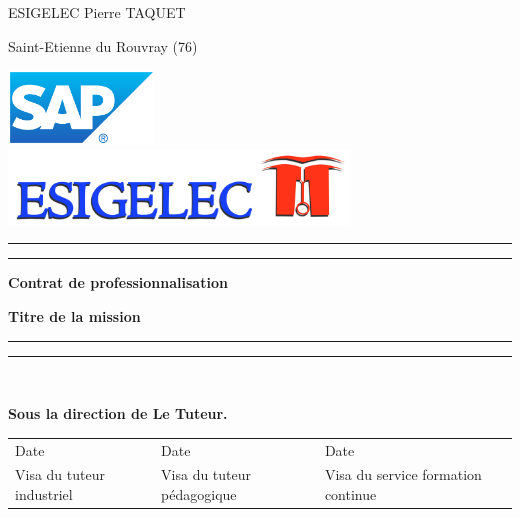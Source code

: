 
\begin{titlepage}
\parindent=0pt

ESIGELEC  Pierre TAQUET

Saint-Etienne du Rouvray (76)


\begin{center}
\includegraphics[height=75px]{images/SAP.png}\\
\includegraphics[height=75px]{images/ESIGELEC.jpg}
\end{center}

\rule{\textwidth}{1.6pt}\vspace*{-\baselineskip}\vspace*{2pt} %
\rule{\textwidth}{0.4pt}%
\begin{center}\bfseries\Huge
Contrat de professionnalisation
\end{center}
\hrulefill
\begin{center}\bfseries\LARGE
Titre de la mission
\end{center}
\rule{\textwidth}{0.4pt}\vspace*{-\baselineskip}\vspace{3.2pt} %
\rule{\textwidth}{1.6pt}\\[\baselineskip] %

		
\begin{center}\bfseries\Large
Sous la direction de Le Tuteur.
\end{center}


\begin{table}[b!]
\begin{center}
\begin{tabular}{|l|l|l|}
\hline
Date & Date & Date \\

Visa du tuteur industriel & Visa du tuteur pédagogique & Visa du service formation continue \\[50pt]
\hline
\end{tabular}
\end{center}
\end{table}

\end{titlepage}
\restoregeometry